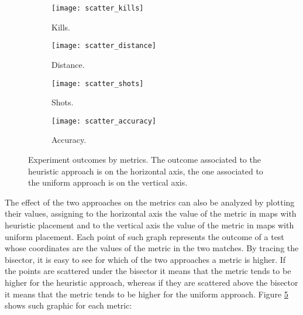 \begin{figure}
\centering
\begin{subfigure}[t]{0.49\linewidth}
\texttt{[image: scatter\_kills]}
\caption{Kills.}
\label{img:scatter_kills}
\end{subfigure}
\hfill
\begin{subfigure}[t]{0.49\linewidth}
\texttt{[image: scatter\_distance]}
\caption{Distance.}
\label{img:scatter_distance}
\end{subfigure}

\begin{subfigure}[t]{0.49\linewidth}
\texttt{[image: scatter\_shots]}
\caption{Shots.}
\label{img:scatter_shots}
\end{subfigure}
\hfill
\begin{subfigure}[t]{0.49\linewidth}
\texttt{[image: scatter\_accuracy]}
\caption{Accuracy.}
\label{img:scatter_accuracy}
\end{subfigure}
\caption[Experiment outcomes by metrics.]{Experiment outcomes by metrics. The outcome associated to the heuristic approach is on the horizontal axis, the one associated to the uniform approach is on the vertical axis.}
\label{img:metrics} 
\end{figure}

The effect of the two approaches on the metrics can also be analyzed by plotting their values, assigning to the horizontal axis the value of the metric in maps with heuristic placement and to the vertical axis the value of the metric in maps with uniform placement. Each point of such graph represents the outcome of a test whose coordinates are the values of the metric in the two matches. By tracing the bisector, it is easy to see for which of the two approaches a metric is higher. If the points are scattered under the bisector it means that the metric tends to be higher for the heuristic approach, whereas if they are scattered above the bisector it means that the metric tends to be higher for the uniform approach. Figure \ref{img:metrics} shows such graphic for each metric:

